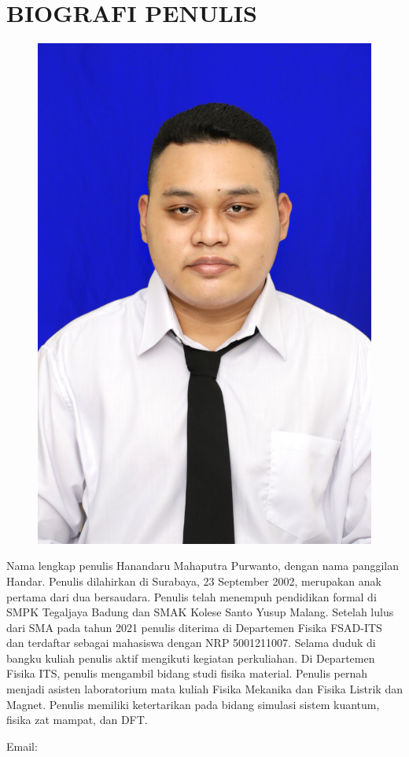 \renewcommand{\thechapter}{\Roman{chapter}}
\chapter*{BIOGRAFI PENULIS}
\renewcommand{\thechapter}{\arabic{chapter}}

\begin{figure}
  \begin{center}
    \vspace{-20pt} %
    \includegraphics[width=.30\textwidth]{./gambar/Pas Foto Handar Ori.JPG}
    \vspace{-20pt} %
  \end{center}
\end{figure}

\noindent Nama lengkap penulis Hanandaru Mahaputra Purwanto, dengan nama panggilan Handar. Penulis dilahirkan di Surabaya, 23 September 2002, merupakan anak pertama dari dua bersaudara. Penulis telah menempuh pendidikan formal di SMPK Tegaljaya Badung dan SMAK Kolese Santo Yusup Malang. Setelah lulus dari SMA pada tahun 2021 penulis diterima di Departemen Fisika FSAD-ITS dan terdaftar sebagai mahasiswa dengan NRP 5001211007. Selama duduk di bangku kuliah penulis aktif mengikuti kegiatan perkuliahan. Di Departemen Fisika ITS, penulis mengambil bidang studi fisika material. Penulis pernah menjadi asisten laboratorium mata kuliah Fisika Mekanika dan Fisika Listrik dan Magnet. Penulis memiliki ketertarikan pada bidang simulasi sistem kuantum, fisika zat mampat, dan DFT.
 
\vspace{7pt}
\noindent Email: \emailMahasiswa

